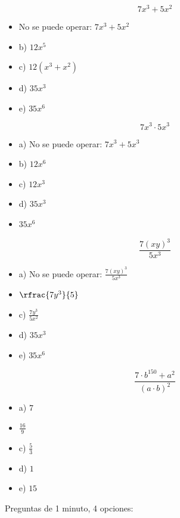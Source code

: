\[
	7x^3+5x^2
\]

\begin{itemize}
	\item {}No se puede operar:  $7x^3+5x^2$
	\item b) $12x^5$
	\item c) $12(x^3+x^2)$
	\item d) $35x^3$
	\item e) $35x^6$
\end{itemize}

\[
	7x^3·5x^3
\]

\begin{itemize}
	\item a) No se puede operar: $7x^3+5x^3$
	\item b) $12x^6$
	\item c) $12x^3$
	\item d) $35x^3$
	\item {} $35x^6$
\end{itemize}


\[
	\frac{7(xy)^3}{5x^3}
\]

\begin{itemize}
	\item a) No se puede operar: $\frac{7(xy)^3}{5x^3}$
	\item {} $\rfrac{7y^3}{5}$
	\item c) $\frac{7y^3}{5x^2}$
	\item d) $35x^3$
	\item e) $35x^6$
\end{itemize}

\[
	\frac{7·b^{150}+a^2}{(a·b)^2}
\]

\begin{itemize}
	\item a) $7$
	\item {} $\frac{16}{9}$
	\item c) $\frac{5}{3}$
	\item d) $1$
	\item e) $15$
\end{itemize}


\newbloq Preguntas de 1 minuto, 4 opciones:

